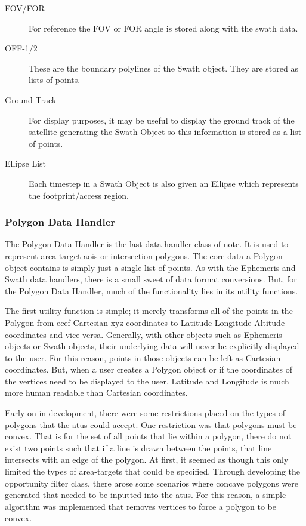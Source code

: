\begin{description} 

    \item[FOV/FOR] For reference the FOV or FOR angle is stored along with the
	swath data.

    \item[OFF-1/2] These are the boundary polylines of the Swath object. They
	are stored as lists of points.

    \item[Ground Track] For display purposes, it may be useful to display the
	ground track of the satellite generating the Swath Object so this
	information is stored as a list of points.

    \item[Ellipse List] Each timestep in a Swath Object is also given an
	Ellipse which represents the footprint/access region. 

\end{description}


\subsubsection{Polygon Data Handler}

The Polygon Data Handler is the last data handler class of note. It is used to
represent area target \glspl{aoi} or intersection polygons. The core data a
Polygon object contains is simply just a single list of points.  As with the
Ephemeris and Swath data handlers, there is a small sweet of data format
conversions.  But, for the Polygon Data Handler, much of the functionality lies
in its utility functions.

The first utility function is simple; it merely transforms all of the points in
the Polygon from \acrfull{ecef} Cartesian-xyz coordinates to
Latitude-Longitude-Altitude coordinates and vice-versa.  Generally, with other
objects such as Ephemeris objects or Swath objects, their underlying data will
never be explicitly displayed to the user. For this reason, points in those
objects can be left as Cartesian coordinates. But, when a user creates a
Polygon object or if the coordinates of the vertices need to be displayed to
the user, Latitude and Longitude is much more human readable than Cartesian
coordinates. 

Early on in development, there were some restrictions placed on the types of
polygons that the \glspl{atu} could accept. One restriction was that polygons
must be convex. That is for the set of all points that lie within a polygon,
there do not exist two points such that if a line is drawn between the points,
that line intersects with an edge of the polygon. At first, it seemed as though
this only limited the types of area-targets that could be specified. Through
developing the opportunity filter class, there arose some scenarios where
concave polygons were generated that needed to be inputted into the
\glspl{atu}. For this reason, a simple algorithm was implemented that removes
vertices to force a polygon to be convex.  


